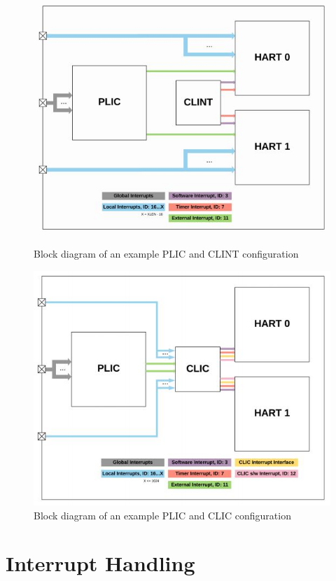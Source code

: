 \documentclass[12pt]{article}
\begin{document}
\begin{figure}
    \centering
    \includegraphics[scale=0.8]{PLIC and CLINT Block Diagram.JPG}
    \caption{Block diagram of an example PLIC and CLINT configuration}
    \label{PLIC_CLINT}
    \vspace{50pt}
    \includegraphics[scale=0.8]{PLIC and CLIC Block Diagram.JPG}
    \caption{Block diagram of an example PLIC and CLIC configuration}
    \label{PLIC_CLIC}
\end{figure}

\section{Interrupt Handling}
\end{document}
